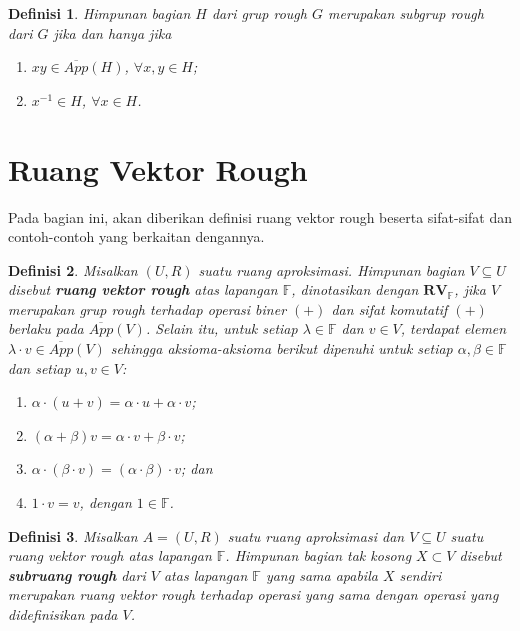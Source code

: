 \documentclass[a4paper,11pt]{article}
\theoremstyle{plain}
\newtheorem{definisi}{Definisi}
\newcommand{\F}{\mathbb{F}}
\newcommand{\upp}[1]{\overline{App}(#1)}
\begin{document}
\begin{definisi}\label{def:10}
      Himpunan bagian $H$ dari grup rough $G$ merupakan subgrup rough dari
      $G$ jika dan hanya jika
      \begin{enumerate}
            \item $xy\in\upp{H}$, $\forall x,y\in H$;
            \item $x^{-1}\in H$, $\forall x\in H$.
      \end{enumerate}
\end{definisi}

\section{Ruang Vektor Rough}

Pada bagian ini, akan diberikan definisi ruang vektor rough beserta
sifat-sifat dan contoh-contoh yang berkaitan dengannya.

\begin{definisi}\label{def:15}
      Misalkan $(U,R)$ suatu ruang aproksimasi. Himpunan bagian $V\subseteq U$
      disebut \textbf{ruang vektor rough} atas lapangan $\F$, dinotasikan dengan
      $\boldsymbol{RV}_{\F}$, jika $V$ merupakan grup rough terhadap operasi
      biner $(+)$ dan sifat komutatif $(+)$ berlaku pada $\upp{V}$. Selain
      itu, untuk setiap $\lambda\in\F$ dan $v\in V$, terdapat elemen
      $\lambda\cdot v\in\upp{V}$ sehingga aksioma-aksioma berikut dipenuhi
      untuk setiap $\alpha,\beta\in\F$ dan setiap $u,v\in V$:
      \begin{enumerate}
            \item $\alpha\cdot(u+v)=\alpha\cdot u+\alpha\cdot v$;
            \item $(\alpha+\beta)v=\alpha\cdot v+\beta\cdot v$;
            \item $\alpha\cdot(\beta\cdot v)=(\alpha\cdot\beta)\cdot v$; dan
            \item $1\cdot v=v$, dengan $1\in\F$.
      \end{enumerate}
\end{definisi}

\begin{definisi}\label{def:16}
      Misalkan $A=(U,R)$ suatu ruang aproksimasi dan $V\subseteq U$ suatu
      ruang vektor rough atas lapangan $\F$. Himpunan bagian tak kosong
      $X\subset V$ disebut \textbf{subruang rough} dari $V$ atas lapangan
      $\F$ yang sama apabila $X$ sendiri merupakan ruang vektor rough
      terhadap operasi yang sama dengan operasi yang didefinisikan pada $V$.
\end{definisi}
\end{document}
